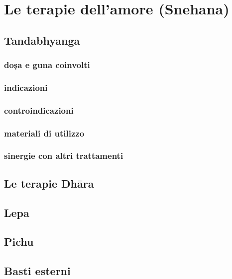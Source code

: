 

\chapter{Le terapie dell'amore (Snehana)}

\section{Tandabhyanga}

 \subsection{do\d{s}a
 e guna coinvolti}
 \subsection{indicazioni}
 \subsection{controindicazioni}
  \subsection{materiali di utilizzo}
  \subsection{sinergie con altri trattamenti}

\section{Le terapie Dh\={a}ra}

\section{Lepa}

\section{Pichu}

\section{Basti esterni}